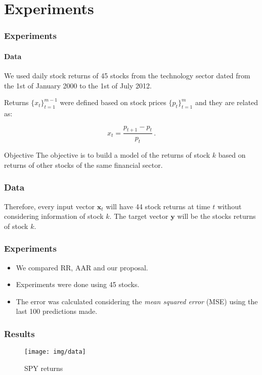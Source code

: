 \section{Experiments} %
\label{sec:Experiments}

\begin{frame}
     \frametitle{Experiments}
     \framesubtitle{Data}

    We used daily stock returns of {\color{blue} 45 stocks} from the
    technology sector dated from the {\color{blue}1st of January 2000
    to the 1st of July 2012}.  
    
    Returns $\{x_t\}_{t=1}^{m-1}$ were
    defined based on stock prices $\{{p_t}\}_{t=1}^{m}$ and they are
    related as:

    \begin{equation*} x_t = \frac{p_{t+1}-p_t}{p_t} \, .
    \end{equation*} 
    \begin{block}{Objective}
    The objective is to build a model of the returns of
    stock $k$ based on returns of other stocks of the same financial
    sector.
    \end{block}

\end{frame}


\begin{frame}
     \frametitle{Data}
    
    Therefore, every input vector $\mathbf{x}_t$ will have 44 stock
    returns at time $t$ without considering information of stock $k$. The
    target vector $\mathbf{y}$ will be the stocks returns of stock $k$.

\end{frame}


\begin{frame}
     \frametitle{Experiments}
     \begin{itemize}
         \item We compared RR, AAR and our proposal.
         \item Experiments were done using 45 stocks.
         \item The error was calculated considering the {\em mean
         squared error} (MSE) using the last 100 predictions made.
     \end{itemize}
    
\end{frame}


\begin{frame}
     \frametitle{Results} 
    \begin{figure}[H]
      \centering
        \texttt{[image: img/data]}
      \caption{SPY returns}
      \label{fig:data}
    \end{figure}
\end{frame}



